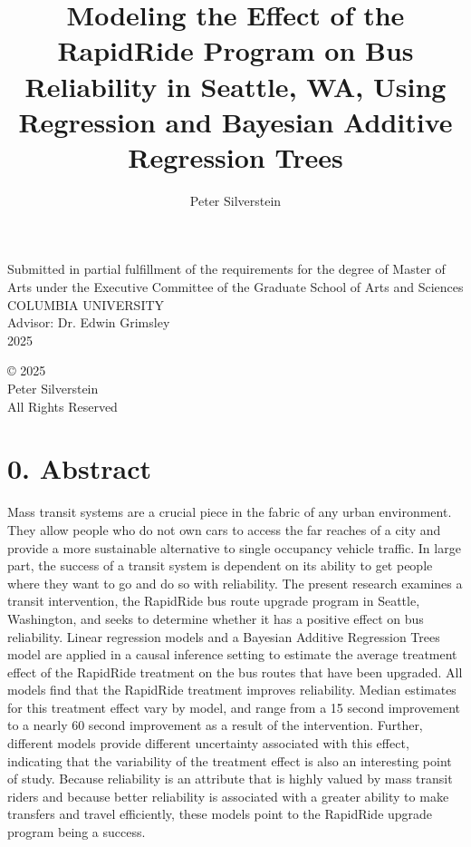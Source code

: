 \documentclass[
  12pt,
]{article}
\title{Modeling the Effect of the RapidRide Program on Bus Reliability
in Seattle, WA, Using Regression and Bayesian Additive Regression Trees}
\author{Peter Silverstein}
\date{}
\begin{document}
\maketitle

\begin{adjustwidth}{1.5in}{1.5in}
\begin{center}
    \fontsize{12pt}{14pt}\selectfont
    {Submitted in partial fulfillment of the requirements for the degree of Master of   Arts under the Executive Committee of the Graduate School of Arts and Sciences}\\[1cm]
    {COLUMBIA UNIVERSITY}\\[1cm]
    {Advisor: Dr. Edwin Grimsley}\\[0.5cm]
    {2025}
\end{center}
\end{adjustwidth}

\newpage

\vspace*{\fill}
\begin{center}
    \fontsize{12pt}{14pt}\selectfont
    {© 2025}\\[0.5cm]
    {Peter Silverstein}\\[0.5cm]
    {All Rights Reserved}\\
\end{center}
\newpage

\tableofcontents

\newpage
{}

\section{0. Abstract}\label{abstract}

Mass transit systems are a crucial piece in the fabric of any urban
environment. They allow people who do not own cars to access the far
reaches of a city and provide a more sustainable alternative to single
occupancy vehicle traﬀic. In large part, the success of a transit system
is dependent on its ability to get people where they want to go and do
so with reliability. The present research examines a transit
intervention, the RapidRide bus route upgrade program in Seattle,
Washington, and seeks to determine whether it has a positive effect on
bus reliability. Linear regression models and a Bayesian Additive
Regression Trees model are applied in a causal inference setting to
estimate the average treatment effect of the RapidRide treatment on the
bus routes that have been upgraded. All models find that the RapidRide
treatment improves reliability. Median estimates for this treatment
effect vary by model, and range from a 15 second improvement to a nearly
60 second improvement as a result of the intervention. Further,
different models provide different uncertainty associated with this
effect, indicating that the variability of the treatment effect is also
an interesting point of study. Because reliability is an attribute that
is highly valued by mass transit riders and because better reliability
is associated with a greater ability to make transfers and travel
eﬀiciently, these models point to the RapidRide upgrade program being a
success.
\end{document}
